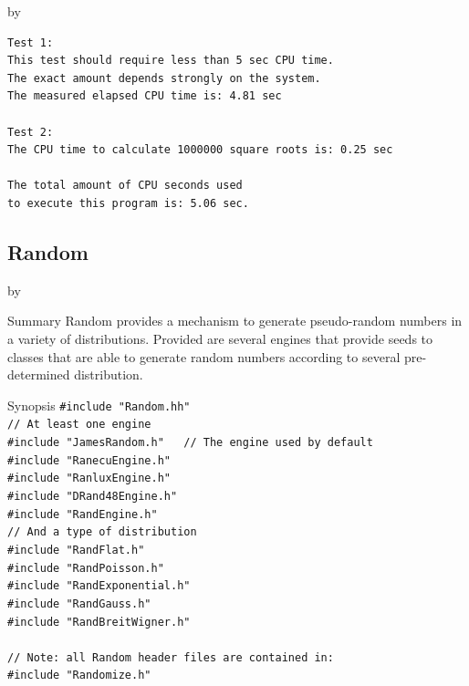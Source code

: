 \documentclass[twoside]{article}
\newcommand{\entrylabel}[1]{\mbox{\textbf{{#1}}}\hfil}%
\newenvironment{entry}
{\begin{list}{}%
    {\renewcommand{\makelabel}{\entrylabel}%
     \setlength{\labelwidth}{90pt}%
     \setlength{\leftmargin}{\labelwidth}
     \advance\leftmargin by \labelsep%
      }%
    }%
  {\end{list}}
\newcommand{\Entrylabel}[1]%
{\raisebox{0pt}[1ex][0pt]{\makebox[\labelwidth][l]%
    {\parbox[t]{\labelwidth}{\hspace{0pt}\textbf{{#1}}}}}}
\newenvironment{Entry}%
{\renewcommand{\entrylabel}{\Entrylabel}\begin{entry}}%
  {\end{entry}}
\begin{document}
\begin{description}
\begin{Entry}
{\begin{verbatim}
Test 1:
This test should require less than 5 sec CPU time. 
The exact amount depends strongly on the system.
The measured elapsed CPU time is: 4.81 sec

Test 2:
The CPU time to calculate 1000000 square roots is: 0.25 sec

The total amount of CPU seconds used 
to execute this program is: 5.06 sec.
\end{verbatim}
}

\end{Entry}

\clearpage

%
%
\subsection{Random } \label{Random}
\begin{Entry}
\item[Summary]
    Random provides a mechanism to generate pseudo-random numbers in
    a variety of distributions.  Provided are several engines
    that provide seeds to classes that are able to generate random
    numbers according to several pre-determined distribution.
    
\item[Synopsis]
    \verb+#include "Random.hh"+\\
    \verb+// At least one engine+\\
    \verb+#include "JamesRandom.h"   // The engine used by default+\\
    \verb+#include "RanecuEngine.h"+\\
    \verb+#include "RanluxEngine.h"+\\
    \verb+#include "DRand48Engine.h"+\\
    \verb+#include "RandEngine.h"+\\
    \verb+// And a type of distribution+\\
    \verb+#include "RandFlat.h"+\\
    \verb+#include "RandPoisson.h"+\\
    \verb+#include "RandExponential.h"+\\
    \verb+#include "RandGauss.h"+\\
    \verb+#include "RandBreitWigner.h"+\\ \\
    \verb+// Note: all Random header files are contained in:+\\
    \verb+#include "Randomize.h"+\\
    

\end{Entry}
\end{description}
\end{document}
